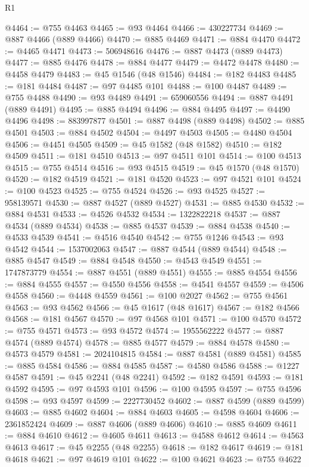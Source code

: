 \begin{lexlean}{R1}
\begin{coremodule}
@4464 := @755 @4463
@4465 := @93 @4464
@4466 := 430227734
@4469 := @887 @4466 (@889 @4466)
@4470 := @885 @4469
@4471 := @884 @4470
@4472 := @4465 @4471
@4473 := 506948616
@4476 := @887 @4473 (@889 @4473)
@4477 := @885 @4476
@4478 := @884 @4477
@4479 := @4472 @4478
@4480 := @4458 @4479
@4483 := @45 @1546 (@48 @1546)
@4484 := @182 @4483
@4485 := @181 @4484
@4487 := @97 @4485 @101
@4488 := @100 @4487
@4489 := @755 @4488
@4490 := @93 @4489
@4491 := 659060556
@4494 := @887 @4491 (@889 @4491)
@4495 := @885 @4494
@4496 := @884 @4495
@4497 := @4490 @4496
@4498 := 883997877
@4501 := @887 @4498 (@889 @4498)
@4502 := @885 @4501
@4503 := @884 @4502
@4504 := @4497 @4503
@4505 := @4480 @4504
@4506 := @4451 @4505
@4509 := @45 @1582 (@48 @1582)
@4510 := @182 @4509
@4511 := @181 @4510
@4513 := @97 @4511 @101
@4514 := @100 @4513
@4515 := @755 @4514
@4516 := @93 @4515
@4519 := @45 @1570 (@48 @1570)
@4520 := @182 @4519
@4521 := @181 @4520
@4523 := @97 @4521 @101
@4524 := @100 @4523
@4525 := @755 @4524
@4526 := @93 @4525
@4527 := 958139571
@4530 := @887 @4527 (@889 @4527)
@4531 := @885 @4530
@4532 := @884 @4531
@4533 := @4526 @4532
@4534 := 1322822218
@4537 := @887 @4534 (@889 @4534)
@4538 := @885 @4537
@4539 := @884 @4538
@4540 := @4533 @4539
@4541 := @4516 @4540
@4542 := @755 @1246
@4543 := @93 @4542
@4544 := 1537002063
@4547 := @887 @4544 (@889 @4544)
@4548 := @885 @4547
@4549 := @884 @4548
@4550 := @4543 @4549
@4551 := 1747873779
@4554 := @887 @4551 (@889 @4551)
@4555 := @885 @4554
@4556 := @884 @4555
@4557 := @4550 @4556
@4558 := @4541 @4557
@4559 := @4506 @4558
@4560 := @4448 @4559
@4561 := @100 @2027
@4562 := @755 @4561
@4563 := @93 @4562
@4566 := @45 @1617 (@48 @1617)
@4567 := @182 @4566
@4568 := @181 @4567
@4570 := @97 @4568 @101
@4571 := @100 @4570
@4572 := @755 @4571
@4573 := @93 @4572
@4574 := 1955562222
@4577 := @887 @4574 (@889 @4574)
@4578 := @885 @4577
@4579 := @884 @4578
@4580 := @4573 @4579
@4581 := 2024104815
@4584 := @887 @4581 (@889 @4581)
@4585 := @885 @4584
@4586 := @884 @4585
@4587 := @4580 @4586
@4588 := @1227 @4587
@4591 := @45 @2241 (@48 @2241)
@4592 := @182 @4591
@4593 := @181 @4592
@4595 := @97 @4593 @101
@4596 := @100 @4595
@4597 := @755 @4596
@4598 := @93 @4597
@4599 := 2227730452
@4602 := @887 @4599 (@889 @4599)
@4603 := @885 @4602
@4604 := @884 @4603
@4605 := @4598 @4604
@4606 := 2361852424
@4609 := @887 @4606 (@889 @4606)
@4610 := @885 @4609
@4611 := @884 @4610
@4612 := @4605 @4611
@4613 := @4588 @4612
@4614 := @4563 @4613
@4617 := @45 @2255 (@48 @2255)
@4618 := @182 @4617
@4619 := @181 @4618
@4621 := @97 @4619 @101
@4622 := @100 @4621
@4623 := @755 @4622

\end{coremodule}
\end{lexlean}
